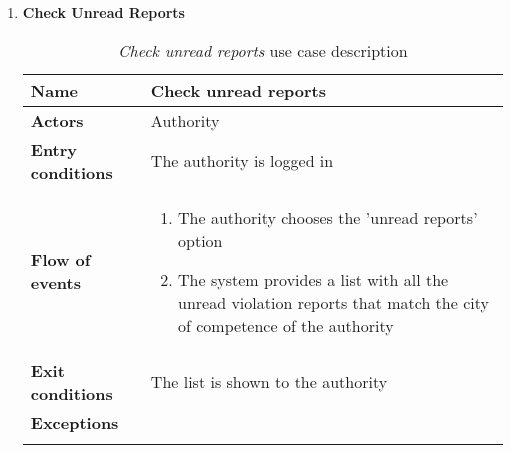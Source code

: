 \begin{enumerate}
		\item \textbf{Check Unread Reports}
			\begin{longtable}{p{0.25\linewidth}p{0.75\linewidth}}
				\toprule
				\textbf{Name} & \textbf{Check unread reports} \\
				\midrule
				\textbf{Actors} & Authority\\
				\midrule
				\textbf{Entry conditions} & The authority is logged in \\
				\midrule
				\textbf{Flow of events} & 
				\begin{enumerate}
					\item The authority chooses the 'unread reports' option
					\item The system provides a list with all the unread violation reports that match the city of competence of the authority
				\end{enumerate} \\
				\midrule
				\textbf{Exit conditions} & The list is shown to the authority\\
				\midrule
				\textbf{Exceptions} &  \\
				\bottomrule
				\caption{\emph{Check unread reports} use case description}
			\end{longtable}
			

\end{enumerate}
